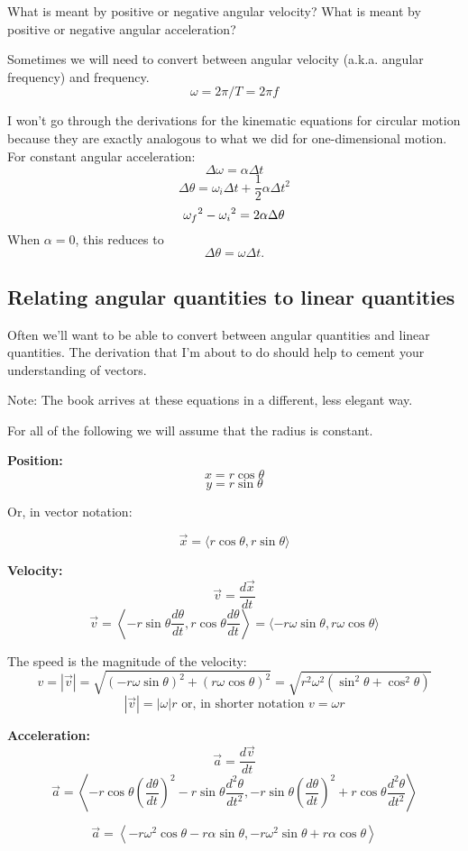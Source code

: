 What is meant by positive or negative angular velocity? What is meant by positive or negative angular acceleration?

Sometimes we will need to convert between angular velocity (a.k.a. angular frequency) and frequency.
$$\omega=2\pi/T=2\pi f$$

I won't go through the derivations for the kinematic equations for circular motion because they are exactly analogous to what we did for one-dimensional motion. For constant angular acceleration:
$$\Delta\omega=\alpha\Delta{t}$$
$$\Delta\theta=\omega_i\Delta{t}+\frac{1}{2}\alpha\Delta{t}^2$$
$$\omega_f\displaystyle^2-\omega_i\displaystyle^2=2\alpha\Delta\theta$$
When $\alpha=0$, this reduces to
$$\Delta\theta=\omega\Delta{t}.$$

\subsection{Relating angular quantities to linear quantities}
Often we'll want to be able to convert between angular quantities and linear quantities. The derivation that I'm about to do should help to cement your understanding of vectors.

Note: The book arrives at these equations in a different, less elegant way.

For all of the following we will assume that the radius is constant.

\textbf{Position:}
$$x=r\cos\theta$$
$$y=r\sin\theta$$

Or, in vector notation:

$$\boxed{\vec x=\langle{r\cos\theta,r\sin\theta}\rangle}$$

\textbf{Velocity:}
$$\vec v=\frac{d\vec x}{dt}$$
$$\boxed{\vec v=\left\langle{-r\sin\theta\frac{d\theta}{dt},r\cos\theta\frac{d\theta}{dt}}\right\rangle=\langle{-r\omega\sin\theta,r\omega\cos\theta}\rangle}$$

The speed is the magnitude of the velocity:
$$v=|\vec{v}|=\sqrt{(-r\omega\sin\theta)^2+(r\omega\cos\theta)^2}=\sqrt{r^2\omega^2(\sin^2\theta+\cos^2\theta)}$$
$$\boxed{|\vec{v}|=|\omega| r} \mbox{ or, in shorter notation } \boxed{v=\omega r}$$


\textbf{Acceleration:}
$$\vec{a}=\frac{d\vec{v}}{dt}$$
$$\vec{a}=\left\langle{-r\cos\theta\left(\frac{d\theta}{dt}\right)^2-r\sin\theta\frac{d^2\theta}{dt^2}},-r\sin\theta\left(\frac{d\theta}{dt}\right)^2+r\cos\theta\frac{d^2\theta}{dt^2}\right\rangle$$

$$\boxed{\vec a=\left\langle{-r\omega^2\cos\theta-r\alpha\sin\theta,-r\omega^2\sin\theta+r\alpha\cos\theta}\right\rangle}$$


